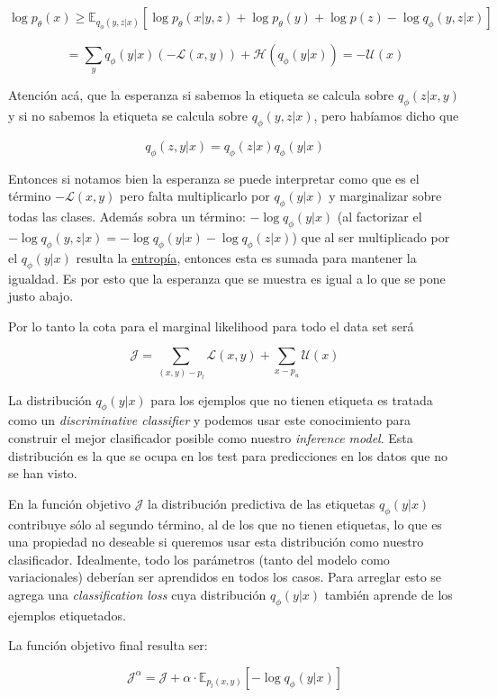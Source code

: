 \documentclass[letterpaper,11pt]{article} %
\begin{document}
	$$ \log p_{\theta}(x) \geq
	\mathbb{E}_{q_{\phi}(y,z|x)}[\log p_{\theta}(x|y,z) + \log p_{\theta}(y) + \log p(z) -\log q_{\phi}(y,z|x)] $$
	
	$$ = \sum_{y} q_{\phi}(y|x) (-\mathcal{L}(x,y)) + \mathcal{H}(q_{\phi}(y|x)) = -\mathcal{U}(x) $$

	Atención acá, que la esperanza si sabemos la etiqueta se calcula sobre $q_{\phi}(z|x,y)$ y si no sabemos la etiqueta se calcula sobre $q_{\phi}(y,z|x)$, pero habíamos dicho que
	
	$$  q_{\phi}(z,y|x) = q_{\phi}(z|x)q_{\phi}(y|x)  $$
	
	Entonces si notamos bien la esperanza se puede interpretar como que es el término $-\mathcal{L}(x,y)$ pero falta multiplicarlo por $q_{\phi}(y|x)$ y marginalizar sobre todas las clases. Además sobra un término: $-\log q_{\phi}(y|x)$ (al factorizar el $-\log q_{\phi}(y,z|x) = -\log q_{\phi}(y|x) - \log q_{\phi}(z|x)$) que al ser multiplicado por el $q_{\phi}(y|x)$ resulta la \href{https://en.wikipedia.org/wiki/Maximum_entropy_probability_distribution}{entropía}, entonces esta es sumada para mantener la igualdad. Es por esto que la esperanza que se muestra es igual a lo que se pone justo abajo.
	
	Por lo tanto la cota para el marginal likelihood para todo el data set será
	
	$$ \mathcal{J} = \sum_{(x,y)-p_{l}} \mathcal{L}(x,y) + \sum_{x - p_{u}} \mathcal{U}(x) $$
	
	La distribución $q_{\phi}(y|x)$ para los ejemplos que no tienen etiqueta es tratada como un \textit{discriminative classifier} y podemos usar este conocimiento para construir el mejor clasificador posible como nuestro \textit{inference model}. Esta distribución es la que se ocupa en los test para predicciones en los datos que no se han visto.
	
	En la función objetivo $\mathcal{J}$ la distribución predictiva de las etiquetas $q_{\phi}(y|x)$ contribuye sólo al segundo término, al de los que no tienen etiquetas, lo que es una propiedad no deseable si queremos usar esta distribución como nuestro clasificador. Idealmente, todo los parámetros (tanto del modelo como variacionales) deberían ser aprendidos en todos los casos. Para arreglar esto se agrega una \textit{classification loss} cuya distribución $q_{\phi}(y|x)$ también aprende de los ejemplos etiquetados.
	
	La función objetivo final resulta ser:
	
	$$ \mathcal{J}^{\alpha} = \mathcal{J} + \alpha \cdot \mathbb{E}_{p_{l}(x,y)}[- \log q_{\phi}(y|x)] $$
	
\end{document}
